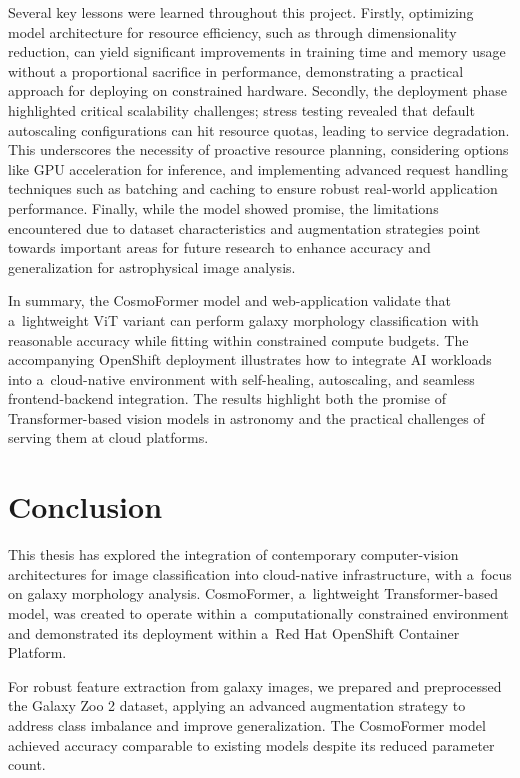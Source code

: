 Several key lessons were learned throughout this project. Firstly, optimizing model architecture for resource efficiency, such as through dimensionality reduction, can yield significant improvements in training time and memory usage without a proportional sacrifice in performance, demonstrating a practical approach for deploying on constrained hardware. Secondly, the deployment phase highlighted critical scalability challenges; stress testing revealed that default autoscaling configurations can hit resource quotas, leading to service degradation. This underscores the necessity of proactive resource planning, considering options like GPU acceleration for inference, and implementing advanced request handling techniques such as batching and caching to ensure robust real-world application performance. Finally, while the model showed promise, the limitations encountered due to dataset characteristics and augmentation strategies point towards important areas for future research to enhance accuracy and generalization for astrophysical image analysis.

In summary, the CosmoFormer model and web-application validate that a~lightweight ViT variant can perform galaxy morphology classification with reasonable accuracy while fitting within constrained compute budgets. The accompanying OpenShift deployment illustrates how to integrate AI workloads into a~cloud-native environment with self-healing, autoscaling, and seamless frontend-backend integration. The results highlight both the promise of Transformer-based vision models in astronomy and the practical challenges of serving them at cloud platforms.

\chapter{Conclusion}
This thesis has explored the integration of contemporary computer-vision architectures for image classification into cloud-native infrastructure, with a~focus on galaxy morphology analysis. CosmoFormer, a~lightweight Transformer-based model, was created to operate within a~computationally constrained environment and demonstrated its deployment within a~Red Hat OpenShift Container Platform.

For robust feature extraction from galaxy images, we prepared and preprocessed the Galaxy Zoo 2 dataset, applying an advanced augmentation strategy to address class imbalance and improve generalization. The CosmoFormer model achieved accuracy comparable to existing models despite its reduced parameter count.

